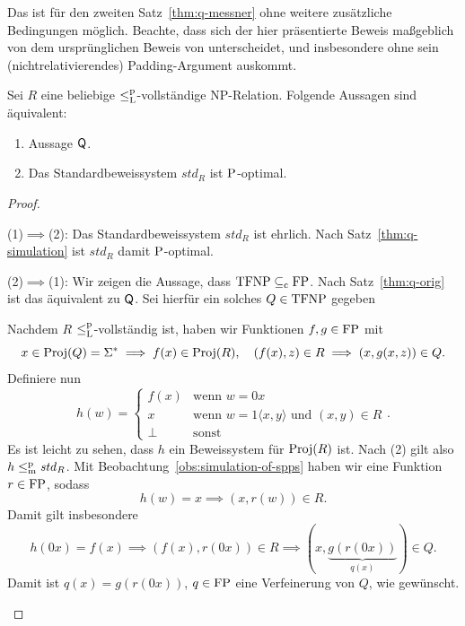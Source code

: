 Das ist für den zweiten Satz~\ref{thm:q-messner} ohne weitere zusätzliche Bedingungen möglich. Beachte, dass sich der hier präsentierte Beweis maßgeblich von dem ursprünglichen Beweis von \textcite[vgl.][Thm.~5.2]{messner_simulation_2001} unterscheidet, und insbesondere ohne sein (nichtrelativierendes) Padding-Argument auskommt.
\begin{theorem}\label{thm:q-messner-generalized}
    Sei $R$ eine beliebige $\leqlp$-vollständige NP-Relation.
    Folgende Aussagen sind äquivalent:
    \begin{enumerate}
        \item Aussage $\hQ$.
        \item Das Standardbeweissystem $\mathit{std}_R$ ist $\P$-optimal.
    \end{enumerate}
\end{theorem}
\begin{proof}
    \begin{prooflist}
    \item (1)$\implies$(2): 
        Das Standardbeweissystem $\mathit{std}_R$ ist ehrlich. Nach Satz~\ref{thm:q-simulation} ist $\mathit{std}_R$ damit $\P$-optimal.

    \item (2)$\implies$(1): Wir zeigen die Aussage, dass $\TFNP\subseteqc\FP$.  Nach Satz~\ref{thm:q-orig} ist das äquivalent zu $\hQ$. Sei hierfür ein solches $Q\in\TFNP$ gegeben

    Nachdem $R$ $\leqlp$-vollständig ist, haben wir Funktionen $f,g\in\FP$ mit
    \[ x\in \Proj(Q)=\Sigma^*\implies  f(x)\in\Proj(R), \quad (f(x), z)\in R\implies (x,g(x,z))\in Q. \]
    Definiere nun
    \[ h(w) = \begin{cases} f(x) & \text{wenn $w=0x$}\\ x & \text{wenn $w=1\langle x, y\rangle$ und $(x,y)\in R$} \\  \bot & \text{sonst} \end{cases}.\]
    Es ist leicht zu sehen, dass $h$ ein Beweissystem für $\Proj(R)$ ist.
    Nach (2) gilt also $h\leqmp \mathit{std}_R$. Mit Beobachtung~\ref{obs:simulation-of-spps} haben wir eine Funktion $r\in\FP$, sodass
    \[ h(w)=x \implies (x, r(w))\in R. \]
    Damit gilt insbesondere
    \[ h(0x)=f(x)\implies (f(x), r(0x))\in R \implies (x, \underbrace{g(r(0x))}_{q(x)})\in Q. \]
    Damit ist $q(x) = g(r(0x))$, $q\in\FP$ eine Verfeinerung von $Q$, wie gewünscht.
\end{prooflist}
\end{proof}


